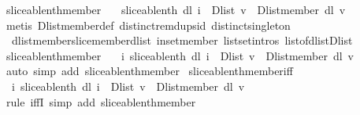 \begin{isabellebody}
\endisatagproof
{\isafoldproof}%
%
\isadelimproof
\isanewline
%
\endisadelimproof
\isanewline
{}\isamarkupfalse%
\ sliceable{\isacharunderscore}nth{\isacharunderscore}member{}{\isacharcolon}\ \isanewline
\ \ {\isachardoublequoteopen}sliceable{\isacharunderscore}nth\ dl\ i\ {\isacharequal}\ Dlist\ {\isacharbrackleft}v{\isacharbrackright}\ {\isasymLongrightarrow}\ Dlist{\isachardot}member\ dl\ v{\isachardoublequoteclose}\isanewline
%
\isadelimproof
%
\endisadelimproof
%
\isatagproof
{}\isamarkupfalse%
\ {\isacharparenleft}metis\ Dlist{\isachardot}member{\isacharunderscore}def\ distinct{\isacharunderscore}remdups{\isacharunderscore}id\ distinct{\isacharunderscore}singleton\ \isanewline
\ \ dlist{\isacharunderscore}member{\isacharunderscore}slice{\isacharunderscore}member{\isacharunderscore}dlist\ in{\isacharunderscore}set{\isacharunderscore}member\ list{\isachardot}set{\isacharunderscore}intros{\isacharparenleft}{}{\isacharparenright}\ list{\isacharunderscore}of{\isacharunderscore}dlist{\isacharunderscore}Dlist{\isacharparenright}%
\endisatagproof
{\isafoldproof}%
%
\isadelimproof
\isanewline
%
\endisadelimproof
\isanewline
{}\isamarkupfalse%
\ sliceable{\isacharunderscore}nth{\isacharunderscore}member{\isacharcolon}\ \isanewline
\ \ {\isachardoublequoteopen}{\isasymexists}i{\isachardot}\ sliceable{\isacharunderscore}nth\ dl\ i\ {\isacharequal}\ Dlist\ {\isacharbrackleft}v{\isacharbrackright}\ {\isasymLongrightarrow}\ Dlist{\isachardot}member\ dl\ v{\isachardoublequoteclose}\isanewline
%
\isadelimproof
%
\endisadelimproof
%
\isatagproof
{}\isamarkupfalse%
\ {\isacharparenleft}auto\ simp\ add{\isacharcolon}\ sliceable{\isacharunderscore}nth{\isacharunderscore}member{}{\isacharparenright}%
\endisatagproof
{\isafoldproof}%
%
\isadelimproof
\isanewline
%
\endisadelimproof
\isanewline
{}\isamarkupfalse%
\ sliceable{\isacharunderscore}nth{\isacharunderscore}member{\isacharunderscore}iff{\isacharcolon}\ \isanewline
\ \ {\isachardoublequoteopen}{\isacharparenleft}{\isasymexists}i{\isachardot}\ sliceable{\isacharunderscore}nth\ dl\ i\ {\isacharequal}\ Dlist\ {\isacharbrackleft}v{\isacharbrackright}{\isacharparenright}\ {\isasymlongleftrightarrow}\ Dlist{\isachardot}member\ dl\ v{\isachardoublequoteclose}\isanewline
%
\isadelimproof
%
\endisadelimproof
%
\isatagproof
{}\isamarkupfalse%
\ {\isacharparenleft}rule\ iffI{\isacharcomma}\ simp\ add{\isacharcolon}\ sliceable{\isacharunderscore}nth{\isacharunderscore}member{\isacharparenright}\isanewline

\end{isabellebody}
